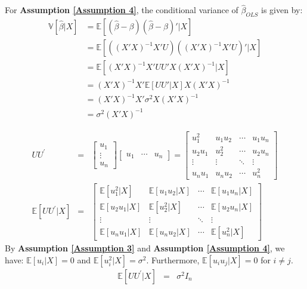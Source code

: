 For \textbf{Assumption \ref{Assumption 4}}, the conditional variance of $\hat{\beta}_{OLS} $ is given by:
\begin{align*}
  \mathbb{V}[\hat{\beta} | X] &= \mathbb{E}[(\hat{\beta} - \beta)(\hat{\beta} - \beta)' | X]\\
  &= \mathbb{E}[((X'X)^{-1}X'U)((X'X)^{-1}X'U)' | X] \\
  &= \mathbb{E}[(X'X)^{-1}X'UU'X(X'X)^{-1} | X]\\
  &= (X'X)^{-1}X'\mathbb{E}[UU' | X]X(X'X)^{-1}\\
  &= (X'X)^{-1}X'\sigma^2X(X'X)^{-1}\\
  &= \sigma^2(X'X)^{-1}
\end{align*}

\begin{note}
  \begin{eqnarray*}
    UU^{\prime} &=& \begin{bmatrix}
      u_1\\
      \vdots\\
      u_n 
    \end{bmatrix} \begin{bmatrix}
      u_1 & \cdots & u_n
    \end{bmatrix} = \begin{bmatrix}
      u_1^2 & u_1 u_2 & \cdots & u_1 u_n\\
      u_2 u_1 & u_2^2 & \cdots & u_2 u_n\\
      \vdots & \vdots & \ddots & \vdots\\
      u_n u_1 & u_n u_2 & \cdots & u_n^2
    \end{bmatrix}\\
    \mathbb{E}[UU^{\prime} | X] &=& \begin{bmatrix}
      \mathbb{E}[u_1^2 | X] & \mathbb{E}[u_1 u_2 | X] & \cdots & \mathbb{E}[u_1 u_n | X]\\
      \mathbb{E}[u_2 u_1 | X] & \mathbb{E}[u_2^2 | X] & \cdots & \mathbb{E}[u_2 u_n | X]\\
      \vdots & \vdots & \ddots & \vdots\\
      \mathbb{E}[u_n u_1 | X] & \mathbb{E}[u_n u_2 | X] & \cdots & \mathbb{E}[u_n^2 | X]
    \end{bmatrix}
  \end{eqnarray*}
  By \textbf{Assumption \ref{Assumption 3}} and \textbf{Assumption \ref{Assumption 4}}, we have:
  $\mathbb{E}[u_i| X] = 0$ and $\mathbb{E}[u_i^2 | X] = \sigma^2$. Furthermore, $\mathbb{E}[u_i u_j | X] = 0$ for $i \neq j$.
  \begin{eqnarray*}
    \mathbb{E}[UU^{\prime} | X] &=& \sigma^{2} I_{n} 
  \end{eqnarray*}
\end{note}

